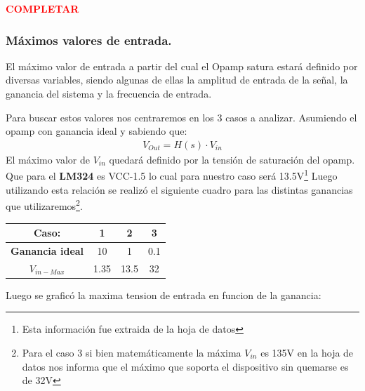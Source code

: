 \begin{center}
\textcolor{red}{\textbf{COMPLETAR}}
\end{center}

\subsubsection{Máximos valores de entrada.}
El máximo valor de entrada a partir del cual el Opamp satura estará definido por diversas variables, siendo algunas de ellas la amplitud de entrada de la señal, la ganancia del sistema y la frecuencia de entrada.

Para buscar estos valores nos centraremos en los 3 casos a analizar. 
Asumiendo el opamp con ganancia ideal y sabiendo que:
\begin{align} V_{Out}=H(s)\cdot V_{in}\end{align}
El máximo valor de $V_{in}$ quedará definido por la tensión de saturación del opamp. Que para el \textbf{LM324} es VCC-1.5 lo cual para nuestro caso será 13.5V\footnote{Esta información fue extraida de la hoja de datos}
Luego utilizando esta relación se realizó el siguiente cuadro para las distintas ganancias que utilizaremos\footnote{Para el caso 3 si bien matemáticamente la máxima $V_{in}$ es 135V en la hoja de datos nos informa que el máximo que soporta el dispositivo sin quemarse es de 32V }.
\begin{table}[H]
\begin{center}
\label{tab:maxin}
\begin{tabular}{|c|c|c|c|}
\hline
\textbf{Caso:}        & \textbf{1} & \textbf{2} & \textbf{3} \\ \hline
\textbf{Ganancia ideal}     & 10         & 1          & 0.1        \\ \hline
\textbf{$V_{in-Max}$} & 1.35       & 13.5       & 32         \\ \hline
\end{tabular}
\end{center}
\end{table}
Luego se graficó la maxima tension de entrada en funcion de la ganancia:
